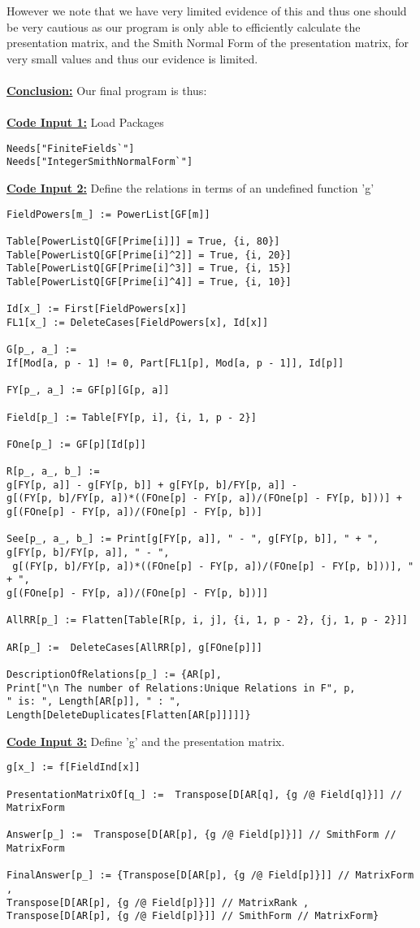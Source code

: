 \documentclass[11pt]{article}
\theoremstyle{plain}
\theoremstyle{definition}
\begin{document}
However we note that we have very limited evidence of this and thus one should be very cautious as our program is only able to efficiently calculate the presentation matrix, and the Smith Normal Form of the presentation matrix, for very small values and thus our evidence is limited.\\
\\
\textbf{\underline{Conclusion:}} Our final program is thus:\\
\\
\textbf{\underline{Code Input 1:}} Load Packages
\begin{verbatim}
Needs["FiniteFields`"]
Needs["IntegerSmithNormalForm`"] 
\end{verbatim}
\textbf{\underline{Code Input 2:}} Define the relations in terms of an undefined function 'g'
\begin{verbatim}
FieldPowers[m_] := PowerList[GF[m]]

Table[PowerListQ[GF[Prime[i]]] = True, {i, 80}]
Table[PowerListQ[GF[Prime[i]^2]] = True, {i, 20}]
Table[PowerListQ[GF[Prime[i]^3]] = True, {i, 15}]
Table[PowerListQ[GF[Prime[i]^4]] = True, {i, 10}]

Id[x_] := First[FieldPowers[x]]
FL1[x_] := DeleteCases[FieldPowers[x], Id[x]]

G[p_, a_] := 
If[Mod[a, p - 1] != 0, Part[FL1[p], Mod[a, p - 1]], Id[p]]

FY[p_, a_] := GF[p][G[p, a]]

Field[p_] := Table[FY[p, i], {i, 1, p - 2}]

FOne[p_] := GF[p][Id[p]]

R[p_, a_, b_] := 
g[FY[p, a]] - g[FY[p, b]] + g[FY[p, b]/FY[p, a]] - 
g[(FY[p, b]/FY[p, a])*((FOne[p] - FY[p, a])/(FOne[p] - FY[p, b]))] + 
g[(FOne[p] - FY[p, a])/(FOne[p] - FY[p, b])]

See[p_, a_, b_] := Print[g[FY[p, a]], " - ", g[FY[p, b]], " + ", g[FY[p, b]/FY[p, a]], " - ",
 g[(FY[p, b]/FY[p, a])*((FOne[p] - FY[p, a])/(FOne[p] - FY[p, b]))], " + ", 
g[(FOne[p] - FY[p, a])/(FOne[p] - FY[p, b])]] 

AllRR[p_] := Flatten[Table[R[p, i, j], {i, 1, p - 2}, {j, 1, p - 2}]]

AR[p_] :=  DeleteCases[AllRR[p], g[FOne[p]]]

DescriptionOfRelations[p_] := {AR[p], 
Print["\n The number of Relations:Unique Relations in F", p, 
" is: ", Length[AR[p]], " : ", 
Length[DeleteDuplicates[Flatten[AR[p]]]]]}
\end{verbatim}
\textbf{\underline{Code Input 3:}} Define 'g' and the presentation matrix.
\begin{verbatim}
g[x_] := f[FieldInd[x]]

PresentationMatrixOf[q_] :=  Transpose[D[AR[q], {g /@ Field[q]}]] // MatrixForm

Answer[p_] :=  Transpose[D[AR[p], {g /@ Field[p]}]] // SmithForm // MatrixForm

FinalAnswer[p_] := {Transpose[D[AR[p], {g /@ Field[p]}]] // MatrixForm , 
Transpose[D[AR[p], {g /@ Field[p]}]] // MatrixRank , 
Transpose[D[AR[p], {g /@ Field[p]}]] // SmithForm // MatrixForm}
\end{verbatim} 
 \pagebreak
\end{document}
